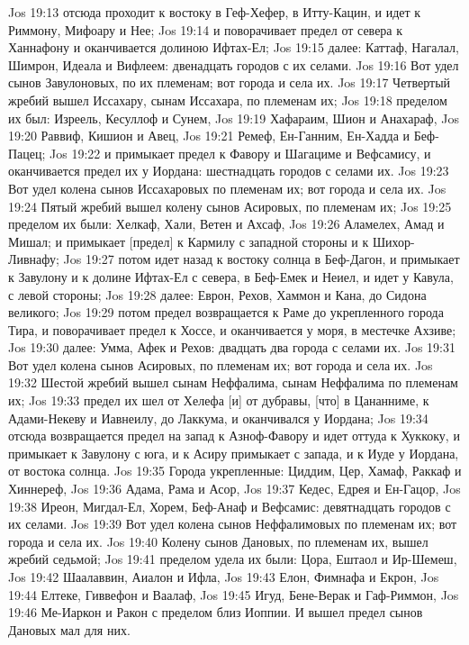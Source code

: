 Jos 19:13  отсюда проходит к востоку в Геф-Хефер, в Итту-Кацин, и идет к Риммону, Мифоару и Нее;
Jos 19:14  и поворачивает предел от севера к Ханнафону и оканчивается долиною Ифтах-Ел;
Jos 19:15  далее: Каттаф, Нагалал, Шимрон, Идеала и Вифлеем: двенадцать городов с их селами.
Jos 19:16  Вот удел сынов Завулоновых, по их племенам; вот города и села их.
Jos 19:17  Четвертый жребий вышел Иссахару, сынам Иссахара, по племенам их;
Jos 19:18  пределом их был: Изреель, Кесуллоф и Сунем,
Jos 19:19  Хафараим, Шион и Анахараф,
Jos 19:20  Раввиф, Кишион и Авец,
Jos 19:21  Ремеф, Ен-Ганним, Ен-Хадда и Беф-Пацец;
Jos 19:22  и примыкает предел к Фавору и Шагациме и Вефсамису, и оканчивается предел их у Иордана: шестнадцать городов с селами их.
Jos 19:23  Вот удел колена сынов Иссахаровых по племенам их; вот города и села их.
Jos 19:24  Пятый жребий вышел колену сынов Асировых, по племенам их;
Jos 19:25  пределом их были: Хелкаф, Хали, Ветен и Ахсаф,
Jos 19:26  Аламелех, Амад и Мишал; и примыкает [предел] к Кармилу с западной стороны и к Шихор-Ливнафу;
Jos 19:27  потом идет назад к востоку солнца в Беф-Дагон, и примыкает к Завулону и к долине Ифтах-Ел с севера, в Беф-Емек и Неиел, и идет у Кавула, с левой стороны;
Jos 19:28  далее: Еврон, Рехов, Хаммон и Кана, до Сидона великого;
Jos 19:29  потом предел возвращается к Раме до укрепленного города Тира, и поворачивает предел к Хоссе, и оканчивается у моря, в местечке Ахзиве;
Jos 19:30  далее: Умма, Афек и Рехов: двадцать два города с селами их.
Jos 19:31  Вот удел колена сынов Асировых, по племенам их; вот города и села их.
Jos 19:32  Шестой жребий вышел сынам Неффалима, сынам Неффалима по племенам их;
Jos 19:33  предел их шел от Хелефа [и] от дубравы, [что] в Цананниме, к Адами-Некеву и Иавнеилу, до Лаккума, и оканчивался у Иордана;
Jos 19:34  отсюда возвращается предел на запад к Азноф-Фавору и идет оттуда к Хуккоку, и примыкает к Завулону с юга, и к Асиру примыкает с запада, и к Иуде у Иордана, от востока солнца.
Jos 19:35  Города укрепленные: Циддим, Цер, Хамаф, Раккаф и Хиннереф,
Jos 19:36  Адама, Рама и Асор,
Jos 19:37  Кедес, Едрея и Ен-Гацор,
Jos 19:38  Иреон, Мигдал-Ел, Хорем, Беф-Анаф и Вефсамис: девятнадцать городов с их селами.
Jos 19:39  Вот удел колена сынов Неффалимовых по племенам их; вот города и села их.
Jos 19:40  Колену сынов Дановых, по племенам их, вышел жребий седьмой;
Jos 19:41  пределом удела их были: Цора, Ештаол и Ир-Шемеш,
Jos 19:42  Шаалаввин, Аиалон и Ифла,
Jos 19:43  Елон, Фимнафа и Екрон,
Jos 19:44  Елтеке, Гиввефон и Ваалаф,
Jos 19:45  Игуд, Бене-Верак и Гаф-Риммон,
Jos 19:46  Ме-Иаркон и Ракон с пределом близ Иоппии. И вышел предел сынов Дановых мал для них.
